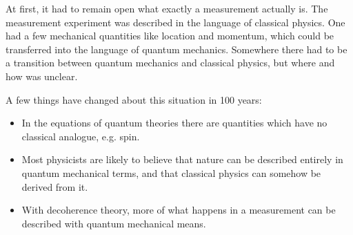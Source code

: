 \documentclass[12pt]{article}
\begin{document}
At first, it had to remain open what exactly a measurement actually is. The measurement experiment was described in the language of classical physics. One had a few mechanical quantities like location and momentum, which could be transferred into the language of quantum mechanics. Somewhere there had to be a transition between quantum mechanics and classical physics, but where and how was unclear.

A few things have changed about this situation in 100 years:
\begin{itemize}
\item In the equations of quantum theories there are quantities which have no classical analogue, e.g. spin. 
\item Most physicists are likely to believe that nature can be described entirely in quantum mechanical terms, and that classical physics can somehow be derived from it.
\item With decoherence theory, more of what happens in a measurement can be described with quantum mechanical means. 
\end{itemize}
\end{document}
